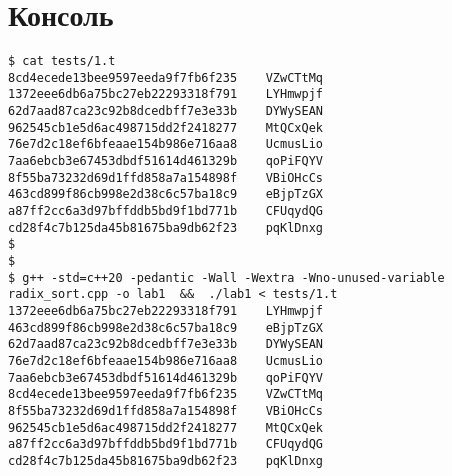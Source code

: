 \pagebreak

\section{Консоль}
\begin{lstlisting}
$ cat tests/1.t
8cd4ecede13bee9597eeda9f7fb6f235	VZwCTtMq
1372eee6db6a75bc27eb22293318f791	LYHmwpjf
62d7aad87ca23c92b8dcedbff7e3e33b	DYWySEAN
962545cb1e5d6ac498715dd2f2418277	MtQCxQek
76e7d2c18ef6bfeaae154b986e716aa8	UcmusLio
7aa6ebcb3e67453dbdf51614d461329b	qoPiFQYV
8f55ba73232d69d1ffd858a7a154898f	VBiOHcCs
463cd899f86cb998e2d38c6c57ba18c9	eBjpTzGX
a87ff2cc6a3d97bffddb5bd9f1bd771b	CFUqydQG
cd28f4c7b125da45b81675ba9db62f23	pqKlDnxg
$
$
$ g++ -std=c++20 -pedantic -Wall -Wextra -Wno-unused-variable radix_sort.cpp -o lab1  &&  ./lab1 < tests/1.t 
1372eee6db6a75bc27eb22293318f791	LYHmwpjf
463cd899f86cb998e2d38c6c57ba18c9	eBjpTzGX
62d7aad87ca23c92b8dcedbff7e3e33b	DYWySEAN
76e7d2c18ef6bfeaae154b986e716aa8	UcmusLio
7aa6ebcb3e67453dbdf51614d461329b	qoPiFQYV
8cd4ecede13bee9597eeda9f7fb6f235	VZwCTtMq
8f55ba73232d69d1ffd858a7a154898f	VBiOHcCs
962545cb1e5d6ac498715dd2f2418277	MtQCxQek
a87ff2cc6a3d97bffddb5bd9f1bd771b	CFUqydQG
cd28f4c7b125da45b81675ba9db62f23	pqKlDnxg
\end{lstlisting}

\pagebreak
